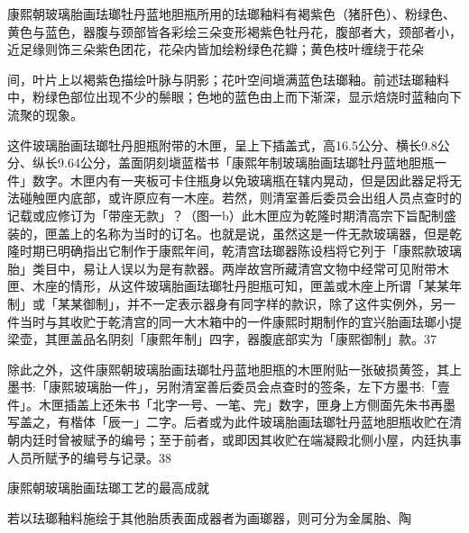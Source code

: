 康熙朝玻璃胎画珐瑯牡丹蓝地胆瓶所用的珐瑯釉料有褐紫色（猪肝色）、粉绿色、黄色与蓝色，器腹与颈部皆各彩绘三朵变形褐紫色牡丹花，腹部者大，颈部者小，近足缘则饰三朵紫色团花，花朵内皆加绘粉绿色花瓣；黄色枝叶缠绕于花朵

\vfill
\begin{BookNotes}
\end{BookNotes}

\noindent 间，叶片上以褐紫色描绘叶脉与阴影；花叶空间塡满蓝色珐瑯釉。前述珐瑯釉料中，粉绿色部位出现不少的鬃眼；色地的蓝色由上而下渐深，显示焙烧时蓝釉向下流聚的现象。

这件玻璃胎画珐瑯牡丹胆瓶附带的木匣，呈上下插盖式，高16.5公分、横长9.8公分、纵长9.64公分，盖面阴刻塡蓝楷书「康熙年制玻璃胎画珐瑯牡丹蓝地胆瓶一件」数字。木匣内有一夹板可卡住瓶身以免玻璃瓶在辖内晃动，但是因此器足将无法碰触匣内底部，或许原应有一木座。若然，则清室善后委员会出组人员点查时的记载或应修订为「带座无款」？（图一b）此木匣应为乾隆时期清高宗下旨配制盛装的，匣盖上的名称为当时的订名。也就是说，虽然这是一件无款玻璃器，但是乾隆时期已明确指出它制作于康熙年间，乾清宫珐瑯器陈设档将它列于「康熙款玻璃胎」类目中，易让人误以为是有款器。两岸故宫所藏清宫文物中经常可见附带木匣、木座的情形，从这件玻璃胎画珐瑯牡丹胆瓶可知，匣盖或木座上所谓「某某年制」或「某某御制」，并不一定表示器身有同字样的款识，除了这件实例外，另一件当时与其收贮于乾清宫的同一大木箱中的一件康熙时期制作的宜兴胎画珐瑯小提梁壶，其匣盖品名阴刻「康熙年制」四字，器腹底部实为「康熙御制」款。37

除此之外，这件康熙朝玻璃胎画珐瑯牡丹蓝地胆瓶的木匣附贴一张破损黄签，其上墨书:「康熙玻璃胎一件」，另附清室善后委员会点查时的签条，左下方墨书:「壹件」。木匣插盖上还朱书「北字一号、一笔、完」数字，匣身上方侧面先朱书再墨写盖之，有楷体「辰一」二字。后者或为此件玻璃胎画珐瑯牡丹蓝地胆瓶收贮在清朝内廷时曾被赋予的编号；至于前者，或即因其收贮在端凝殿北侧小屋，内廷执事人员所赋予的编号与记录。38

康熙朝玻璃胎画珐瑯工艺的最高成就

若以珐瑯釉料施绘于其他胎质表面成器者为画瑯器，则可分为金属胎、陶

\vfill
\begin{BookNotes}
\end{BookNotes}

